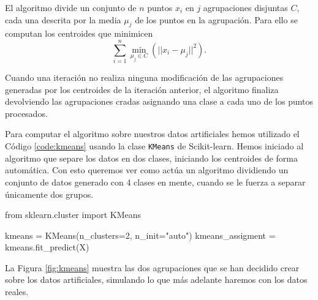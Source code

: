 El algoritmo divide un conjunto de $ n $ puntos $ x_i $ en $ j $ agrupaciones disjuntas $ C $, cada una descrita por la media $ \mu_j $ de los puntos en la agrupación. Para ello se computan los centroides que minimicen
\begin{equation}
  \sum\limits_{i=1}^n \underset{\mu_j \in C}{\operatorname{min}} (|| x_i - \mu_j||^2).
\end{equation}

Cuando una iteración no realiza ninguna modificación de las agrupaciones generadas por los centroides de la iteración anterior, el algoritmo finaliza devolviendo las agrupaciones cradas asignando una clase a cada uno de los puntos procesados.

Para computar el algoritmo sobre nuestros datos artificiales hemos utilizado el Código \ref{code:kmeans} usando la clase \texttt{KMeans} de Scikit-learn. Hemos iniciado al algoritmo que separe los datos en dos clases, iniciando los centroides de forma automática. Con esto queremos ver como actúa un algoritmo dividiendo un conjunto de datos generado con 4 clases en mente, cuando se le fuerza a separar únicamente dos grupos.

\begin{mypython}[float={h}, caption={k-medias.}, label={code:kmeans}]
  from sklearn.cluster import KMeans

  kmeans = KMeans(n_clusters=2, n_init="auto")
  kmeans_assigment = kmeans.fit_predict(X)
\end{mypython}

La Figura \ref{fig:kmeans} muestra las dos agrupaciones que se han decidido crear sobre los datos artificiales, simulando lo que más adelante haremos con los datos reales.

